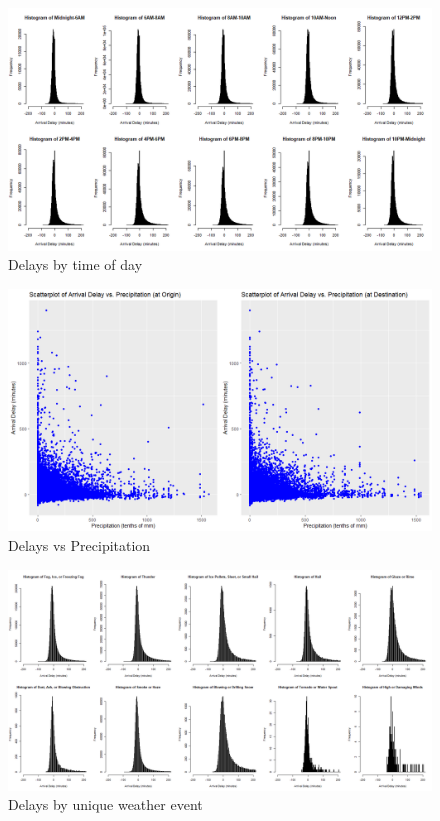 \documentclass[12pt, a4paper, openany]{book}
\begin{document}
			\begin{figure}[h]
			\centering
	 		\includegraphics[width = 1\textwidth]{../figures/PLOTS FOR REPORT/Chapter 4/Figure 4.34}
	 		\caption{Delays by time of day}
	 		\end{figure}

			\begin{figure}[h]
			\centering
	 		\includegraphics[width = 1 \textwidth]{../figures/PLOTS FOR REPORT/Chapter 4/Figure 4.42}
	 		\caption{Delays vs Precipitation}
	 		\end{figure}

			\begin{figure}[h]
			\centering
	 		\includegraphics[width = 1 \textwidth]{../figures/PLOTS FOR REPORT/Chapter 4/Figure 4.43}
	 		\caption{Delays by unique weather event}
	 		\end{figure}
\end{document}
